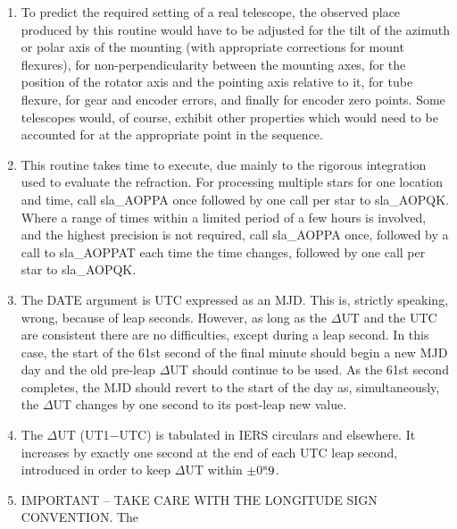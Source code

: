 \documentclass[11pt,twoside,nolof]{starlink}
\providecommand{\tseci}[1]   {$#1$\mbox{$^{\rm s}$}}
\providecommand{\tsec}[2]    {\tseci{#1}$\hspace{-0.3em}.#2$}
\begin{document}
{\begin{enumerate}
        motion, and is the position that would be seen by a perfect
        equatorial located at the observer and with its polar axis
        aligned to the Earth's axis of rotation (\textit{n.b.}\ not to the
        refracted pole).  Finally, the $\alpha$ is obtained by subtracting
        the \textit{h}\/ from the local apparent ST.
  \item To predict the required setting of a real telescope, the
        observed place produced by this routine would have to be
        adjusted for the tilt of the azimuth or polar axis of the
        mounting (with appropriate corrections for mount flexures),
        for non-perpendicularity between the mounting axes, for the
        position of the rotator axis and the pointing axis relative
        to it, for tube flexure, for gear and encoder errors, and
        finally for encoder zero points.  Some telescopes would, of
        course, exhibit other properties which would need to be
        accounted for at the appropriate point in the sequence.
  \item This routine takes time to execute, due mainly to the
        rigorous integration used to evaluate the refraction.
        For processing multiple stars for one location and time,
        call sla\_AOPPA once followed by one call per star to sla\_AOPQK.
        Where a range of times within a limited period of a few hours
        is involved, and the highest precision is not required, call
        sla\_AOPPA once, followed by a call to sla\_AOPPAT each time the
        time changes, followed by one call per star to sla\_AOPQK.
  \item The DATE argument is UTC expressed as an MJD.  This is,
        strictly speaking, wrong, because of leap seconds.  However,
        as long as the $\Delta$UT and the UTC are consistent there
        are no difficulties, except during a leap second.  In this
        case, the start of the 61st second of the final minute should
        begin a new MJD day and the old pre-leap $\Delta$UT should
        continue to be used.  As the 61st second completes, the MJD
        should revert to the start of the day as, simultaneously,
        the $\Delta$UT changes by one second to its post-leap new value.
  \item The $\Delta$UT (UT1$-$UTC) is tabulated in IERS circulars and
        elsewhere.  It increases by exactly one second at the end of
        each UTC leap second, introduced in order to keep $\Delta$UT
        within $\pm$\tsec{0}{9}.
  \item IMPORTANT -- TAKE CARE WITH THE LONGITUDE SIGN CONVENTION.  The

\end{enumerate}}
\end{document}
